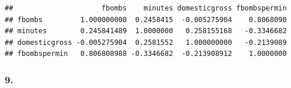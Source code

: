 \documentclass[]{article}
\newenvironment{Shaded}{\begin{snugshade}}{\end{snugshade}}
\newcommand{\DecValTok}[1]{\textcolor[rgb]{0.00,0.00,0.81}{#1}}
\newcommand{\KeywordTok}[1]{\textcolor[rgb]{0.13,0.29,0.53}{\textbf{#1}}}
\newcommand{\NormalTok}[1]{#1}
\newcommand{\OperatorTok}[1]{\textcolor[rgb]{0.81,0.36,0.00}{\textbf{#1}}}
\newcommand{\StringTok}[1]{\textcolor[rgb]{0.31,0.60,0.02}{#1}}
\begin{document}
\begin{verbatim}
##                     fbombs    minutes domesticgross fbombspermin
## fbombs         1.000000000  0.2458415  -0.005275904    0.8068090
## minutes        0.245841489  1.0000000   0.258155168   -0.3346682
## domesticgross -0.005275904  0.2581552   1.000000000   -0.2139089
## fbombspermin   0.806808988 -0.3346682  -0.213908912    1.0000000
\end{verbatim}

\hypertarget{section-8}{%
\subsubsection{9.}\label{section-8}}

\begin{Shaded}
\end{Shaded}
\end{document}

